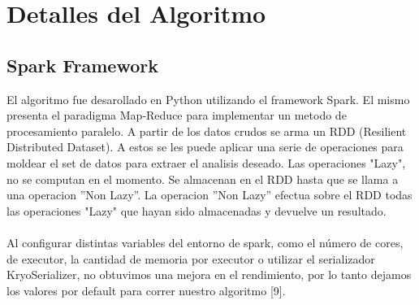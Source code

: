 \documentclass[a4paper,10pt]{article}
\begin{document}
	

	\section{Detalles del Algoritmo}
	
	\subsection{Spark Framework}
	El algoritmo fue desarollado en Python utilizando el framework Spark. El mismo presenta el paradigma Map-Reduce para implementar un metodo de procesamiento paralelo. A partir de los datos crudos se arma un RDD (Resilient Distributed Dataset). A estos se les puede aplicar una serie de operaciones para moldear el set de datos para extraer el analisis deseado. Las operaciones "Lazy", no se computan en el momento. Se almacenan en el RDD hasta que se llama a una operacion ''Non Lazy''. La operacion ''Non Lazy'' efectua sobre el RDD todas las operaciones "Lazy" que hayan sido almacenadas y devuelve un resultado. \\ \\
	 Al configurar distintas variables del entorno de spark, como el n\'{u}mero de cores, de executor, la cantidad de memoria por executor o utilizar el serializador KryoSerializer, no obtuvimos una mejora en el rendimiento, por lo tanto dejamos los valores por default para correr nuestro algoritmo [9].
	
	
	
\end{document}
